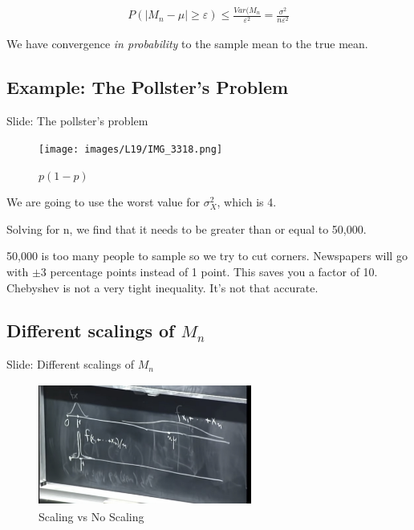 \begin{align}
    P(|M_n - \mu| \ge \varepsilon) \le \frac{Var(M_n}{\varepsilon^2} = \frac{\sigma^2}{n \varepsilon^2}
\end{align}

We have convergence \emph{in probability} to the sample mean to the true mean.

\subsection{Example: The Pollster’s Problem}


Slide: The pollster’s problem\\

\begin{figure}[ht]
\centering
\texttt{[image: images/L19/IMG\_3318.png]}
\caption{$p(1-p)$}
\end{figure}

We are going to use the worst value for $\sigma_X^2$, which is 4.

Solving for n, we find that it needs to be greater than or equal to 50,000.


50,000 is too many people to sample so we try to cut corners.  Newspapers will go with $\pm$3 percentage points instead of 1 point.  This saves you a factor of 10.  Chebyshev is not a very tight inequality.  It's not that accurate.

\subsection{Different scalings of \texorpdfstring{$M_n$}{M}}


Slide: Different scalings of $M_n$

\begin{figure}[ht]
\centering
\includegraphics[width=7cm, height=4cm]{images/L19/IMG_3319.jpeg}
\caption{Scaling vs No Scaling}
\end{figure}

